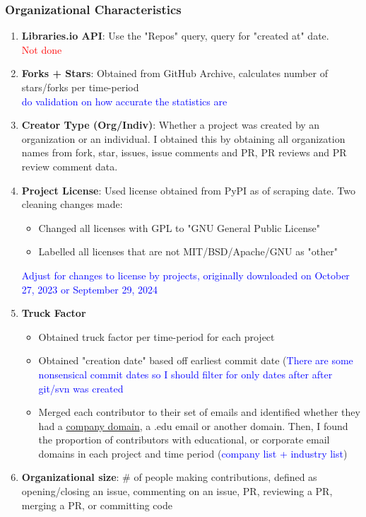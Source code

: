 \documentclass[source/paper/main.tex]{subfiles}
\begin{document}
\subsubsection{Organizational Characteristics}
\begin{enumerate}
    \item \textbf{Libraries.io API}: Use the "Repos" query, query for "created at" date. \\
    \textcolor{red}{Not done}
    \item \textbf{Forks + Stars}: Obtained from GitHub Archive, calculates number of stars/forks per time-period \\
    \textcolor{blue}{do validation on how accurate the statistics are}
    \item \textbf{Creator Type (Org/Indiv)}: Whether a project was created by an organization or an individual. I obtained this by obtaining all organization names from fork, star, issues, issue comments and PR, PR reviews and PR review comment data. 
    \item \textbf{Project License}: Used license obtained from PyPI as of scraping date. Two cleaning changes made:
    \begin{itemize}
        \item Changed all licenses with GPL to "GNU General Public License"
        \item Labelled all licenses that are not MIT/BSD/Apache/GNU as "other"
    \end{itemize} 
    \textcolor{blue}{Adjust for changes to license by projects, originally downloaded on October 27, 2023 or September 29, 2024}
    \item \textbf{Truck Factor}
    \begin{itemize}
        \item Obtained truck factor per time-period for each project
        \item Obtained "creation date" based off earliest commit date (\textcolor{blue}{There are some nonsensical commit dates so I should filter for only dates after after git/svn was created}
        \item Merged each contributor to their set of emails and identified whether they had a \href{https://github.com/liaochris/undergrad_thesis/blob/main/data/inputs/company_domain_match_list.yaml}{company domain}, a .edu email or another domain. Then, I found the proportion of contributors with educational, or corporate email domains in each project and time period (\textcolor{blue}{company list + industry list})
    \end{itemize}
    \item \textbf{Organizational size}: \# of people making contributions, defined as opening/closing an issue, commenting on an issue, PR, reviewing a PR, merging a PR, or committing code
    \end{enumerate}
\end{document}
